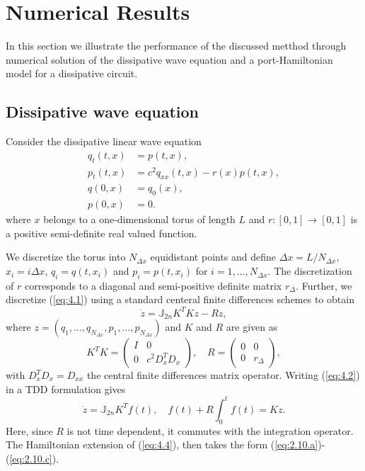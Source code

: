 \section{Numerical Results} \label{sec:4}
In this section we illustrate the performance of the discussed metthod through numerical solution of the dissipative wave equation and a port-Hamiltonian model for a dissipative circuit.

\subsection{Dissipative wave equation}

Consider the dissipative linear wave equation
\begin{equation} \label{eq:4.1}
	\begin{aligned}
		q_{t}(t,x) &= p(t,x), \\
		p_{t}(t,x) &= c^2 q_{xx}(t,x) - r(x)  p(t,x) , \\
		q(0,x) &= q_0(x), \\
		p(0,x) &= 0.
	\end{aligned}
\end{equation}
where $x$ belongs to a one-dimensional torus of length $L$ and $r:[0,1]\to[0,1]$ is a positive semi-definite real valued function. 

We discretize the torus into $N_{\Delta x}$ equidistant points and define $\Delta x = L/N_{\Delta x}$, $x_i = i\Delta x$, $q_i=q(t,x_i)$ and $p_i=p(t,x_i)$ for $i = 1, \dots, N_{\Delta x}$. The discretization of $r$ corresponds to a diagonal and semi-positive definite matrix $r_\Delta$. Further, we discretize (\ref{eq:4.1}) using a standard centeral finite differences schemes to obtain
\begin{equation} \label{eq:4.2}
	\dot z = \mathbb J_{2n} K^T K z - R z,
\end{equation}
where $z = (q_1,\dots,q_{N_{\Delta x}},p_1,\dots,p_{N_{\Delta x}})$ and $K$ and $R$ are given as
\begin{equation} \label{eq:4.3}
	K^T K =
	\begin{pmatrix}
		I & 0 \\
		0 & c^2D_x^TD_x
	\end{pmatrix} , \quad
	R =
	\begin{pmatrix}
		0 & 0 \\
		0 & r_\Delta
	\end{pmatrix},
\end{equation}
with $D_x^TD_x = D_{xx}$ the central finite differences matrix operator. Writing (\ref{eq:4.2}) in a TDD formulation gives
\begin{equation} \label{eq:4.4}
	\dot z = \mathbb J_{2n} K^T f(t), \quad f(t) + R \int_0^t f(t) = K z.
\end{equation}
Here, since $R$ is not time dependent, it commutes with the integration operator. The Hamiltonian extension of (\ref{eq:4.4}), then takes the form (\ref{eq:2.10.a})-(\ref{eq:2.10.c}).

